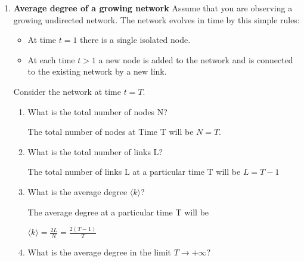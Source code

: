 \documentclass{amsart}
\theoremstyle{definition}
\theoremstyle{remark}
\numberwithin{equation}{section}
\begin{document}
\begin{enumerate}
\begin{enumerate}
\end{enumerate}

\clearpage
\item {\bf Average degree of a growing network} Assume that you are observing a growing undirected network.
The network evolves in time by this simple rules:
\begin{itemize}
\item At time $t = 1$ there is a single isolated node.
\item At each time $t > 1$ a new node is added to the network and is connected
to the existing network by a new link.
\end{itemize}
Consider the network at time $t = T$.
\begin{enumerate}
\item What is the total number of nodes N? \vspace{0.2cm}

The total number of nodes at Time T will be $N = T$.

\vspace{0.5cm}

\item What is the total number of links L? \vspace{1cm}

The total number of links L at a particular time T will be $L = T-1$

\vspace{0.5cm}

\item What is the average degree $\langle k \rangle$? \vspace{0.2cm}

The average degree at a particular time T will be 

$
\langle k \rangle = \frac{2L}{N} = \frac{2\left(T-1\right)}{T}
$

\vspace{0.5cm}

\item What is the average degree in the limit $T \rightarrow +\infty $? \vspace{0.2cm}


\end{enumerate}
\end{enumerate}
\end{document}

